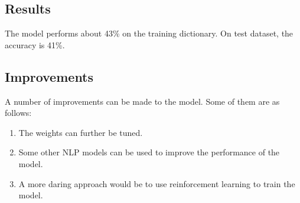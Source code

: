 \documentclass[12pt]{article}
\begin{document}
\subsection{Results}
The model performs about 43\% on the training dictionary. On test dataset, the accuracy is 41\%.

\subsection{Improvements}
A number of improvements can be made to the model. Some of them are as follows:
\begin{enumerate}
    \item The weights can further be tuned.
    \item Some other NLP models can be used to improve the performance of the model.
    \item A more daring approach would be to use reinforcement learning to train the model.
\end{enumerate}
\end{document}
